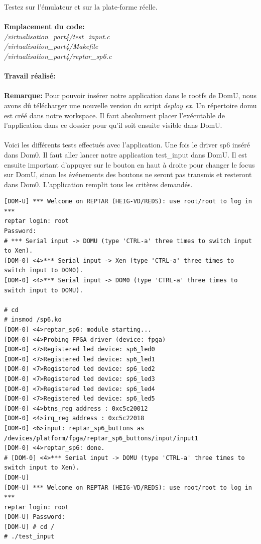 Testez sur l’émulateur et sur la plate-forme réelle.\\\\
\textbf{Emplacement du code:}\\\textit{/virtualisation\_part4/test\_input.c}\\
\textit{/virtualisation\_part4/Makefile}\\
\textit{/virtualisation\_part4/reptar\_sp6.c}\\\\
\color{red}\textbf{Travail réalisé: }\color{black}\\\\

\textbf{Remarque: }Pour pouvoir insérer notre application dans le rootfs de DomU, nous avons dû télécharger une nouvelle version du script \textit{deploy ex}. Un répertoire domu est créé dans notre workspace. Il faut absolument placer l'exécutable de l'application dans ce dossier pour qu'il soit ensuite visible dans DomU.\\\\
Voici les différents tests effectués avec l'application. Une fois le driver sp6 inséré dans Dom0. Il faut aller lancer notre application test\_input dans DomU. Il est ensuite important d'appuyer sur le bouton en haut à droite pour changer le focus sur DomU, sinon les événements des boutons ne seront pas transmis et resteront dans Dom0.
L'application remplit tous les critères demandés.
\begin{lstlisting}
[DOM-U] *** Welcome on REPTAR (HEIG-VD/REDS): use root/root to log in ***
reptar login: root
Password: 
# *** Serial input -> DOMU (type 'CTRL-a' three times to switch input to Xen).
[DOM-0] <4>*** Serial input -> Xen (type 'CTRL-a' three times to switch input to DOM0).
[DOM-0] <4>*** Serial input -> DOM0 (type 'CTRL-a' three times to switch input to DOMU).

# cd
# insmod /sp6.ko 
[DOM-0] <4>reptar_sp6: module starting...
[DOM-0] <4>Probing FPGA driver (device: fpga)
[DOM-0] <7>Registered led device: sp6_led0
[DOM-0] <7>Registered led device: sp6_led1
[DOM-0] <7>Registered led device: sp6_led2
[DOM-0] <7>Registered led device: sp6_led3
[DOM-0] <7>Registered led device: sp6_led4
[DOM-0] <7>Registered led device: sp6_led5
[DOM-0] <4>btns_reg address : 0xc5c20012
[DOM-0] <4>irq_reg address : 0xc5c22018
[DOM-0] <6>input: reptar_sp6_buttons as /devices/platform/fpga/reptar_sp6_buttons/input/input1
[DOM-0] <4>reptar_sp6: done.
# [DOM-0] <4>*** Serial input -> DOMU (type 'CTRL-a' three times to switch input to Xen).
[DOM-U] 
[DOM-U] *** Welcome on REPTAR (HEIG-VD/REDS): use root/root to log in ***
reptar login: root
[DOM-U] Password: 
[DOM-U] # cd /
# ./test_input 
\end{lstlisting}
